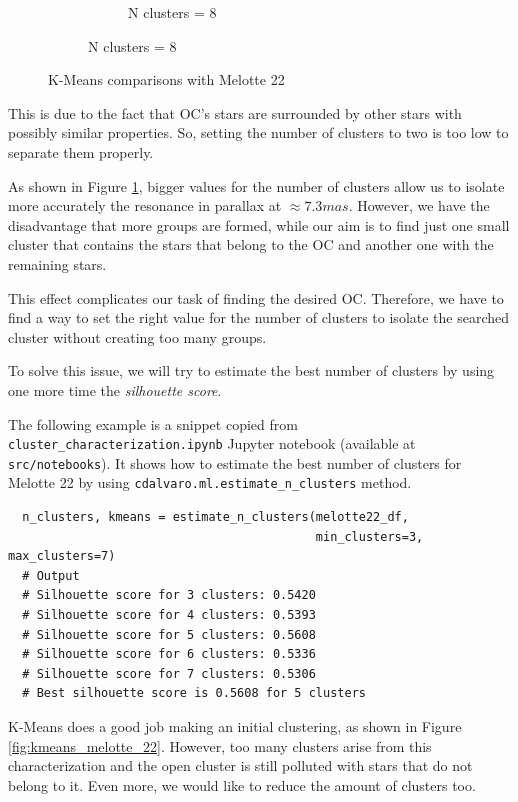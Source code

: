 \documentclass[11pt, a4paper, english]{book}
\begin{document}
\begin{figure}[htbp]
\begin{subfigure}{0.9\textwidth}
\begin{subfigure}[t]{0.3\textwidth}
      \caption{N clusters = 8}
    \end{subfigure}
  \end{subfigure}
  \caption{K-Means comparisons with Melotte 22}
  \label{fig:kmeans_comparisons_melotte_22}
\end{figure}

This is due to the fact that OC's stars are surrounded by other stars with possibly similar properties. So, setting the number of clusters
to two is too low to separate them properly.

As shown in Figure \ref{fig:kmeans_comparisons_melotte_22}, bigger values for the number of clusters allow us to isolate more accurately
the resonance in parallax at $\approx 7.3mas$. However, we have the disadvantage that more groups are formed, while our aim is to find just
one small cluster that contains the stars that belong to the OC and another one with the remaining stars.

This effect complicates our task of finding the desired OC. Therefore, we have to find
a way to set the right value for the number of clusters to isolate the searched cluster without creating too many groups.

To solve this issue, we will try to estimate the best number of clusters by using one more time the \emph{silhouette score}.

The following example is a snippet copied from \verb|cluster_characterization.ipynb| Jupyter notebook (available at \verb|src/notebooks|).
It shows how to estimate the best number of clusters for Melotte 22 by using \verb|cdalvaro.ml.estimate_n_clusters| method.

\begin{verbatim}
  n_clusters, kmeans = estimate_n_clusters(melotte22_df,
                                           min_clusters=3, max_clusters=7)
  # Output
  # Silhouette score for 3 clusters: 0.5420
  # Silhouette score for 4 clusters: 0.5393
  # Silhouette score for 5 clusters: 0.5608
  # Silhouette score for 6 clusters: 0.5336
  # Silhouette score for 7 clusters: 0.5306
  # Best silhouette score is 0.5608 for 5 clusters
\end{verbatim}

K-Means does a good job making an initial clustering, as shown in Figure \ref{fig:kmeans_melotte_22}. However, too many clusters arise from this characterization
and the open cluster is still polluted with stars that do not belong to it. Even more, we would like to reduce the amount of clusters too.
\end{document}
